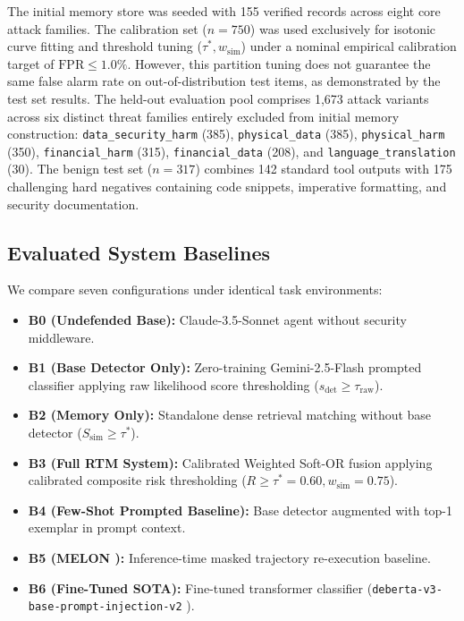 \documentclass[conference]{IEEEtran}
\begin{document}
The initial memory store was seeded with 155 verified records across eight core attack families. The calibration set ($n=750$) was used exclusively for isotonic curve fitting and threshold tuning ($\tau^*, w_{\text{sim}}$) under a nominal empirical calibration target of $\text{FPR} \le 1.0\%$. However, this partition tuning does not guarantee the same false alarm rate on out-of-distribution test items, as demonstrated by the test set results. The held-out evaluation pool comprises 1,673 attack variants across six distinct threat families entirely excluded from initial memory construction: \texttt{data\_security\_harm} (385), \texttt{physical\_data} (385), \texttt{physical\_harm} (350), \texttt{financial\_harm} (315), \texttt{financial\_data} (208), and \texttt{language\_translation} (30). The benign test set ($n=317$) combines 142 standard tool outputs with 175 challenging hard negatives containing code snippets, imperative formatting, and security documentation.

\subsection{Evaluated System Baselines}
We compare seven configurations under identical task environments:
\begin{itemize}
    \item \textbf{B0 (Undefended Base):} Claude-3.5-Sonnet agent without security middleware.
    \item \textbf{B1 (Base Detector Only):} Zero-training Gemini-2.5-Flash prompted classifier applying raw likelihood score thresholding ($s_{\text{det}} \ge \tau_{\text{raw}}$).
    \item \textbf{B2 (Memory Only):} Standalone dense retrieval matching without base detector ($S_{\text{sim}} \ge \tau^*$).
    \item \textbf{B3 (Full RTM System):} Calibrated Weighted Soft-OR fusion applying calibrated composite risk thresholding ($R \ge \tau^* = 0.60, w_{\text{sim}} = 0.75$).
    \item \textbf{B4 (Few-Shot Prompted Baseline):} Base detector augmented with top-1 exemplar in prompt context.
    \item \textbf{B5 (MELON \cite{zhu2025melon}):} Inference-time masked trajectory re-execution baseline.
    \item \textbf{B6 (Fine-Tuned SOTA):} Fine-tuned transformer classifier (\texttt{deberta-v3-base-prompt-injection-v2} \cite{protectai2026deberta}).
\end{itemize}
\end{document}
